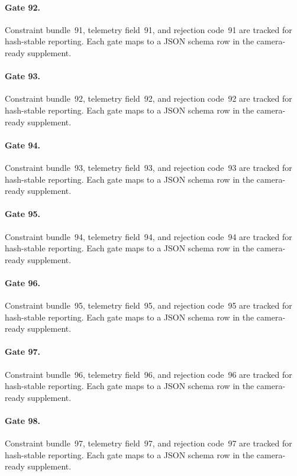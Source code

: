 \documentclass[sigconf,nonacm]{acmart}
\begin{document}
\paragraph{Gate 92.}
Constraint bundle~91, telemetry field~91, and rejection code~91 are tracked for hash-stable reporting. Each gate maps to a JSON schema row in the camera-ready supplement. %

\paragraph{Gate 93.}
Constraint bundle~92, telemetry field~92, and rejection code~92 are tracked for hash-stable reporting. Each gate maps to a JSON schema row in the camera-ready supplement. %

\paragraph{Gate 94.}
Constraint bundle~93, telemetry field~93, and rejection code~93 are tracked for hash-stable reporting. Each gate maps to a JSON schema row in the camera-ready supplement. %

\paragraph{Gate 95.}
Constraint bundle~94, telemetry field~94, and rejection code~94 are tracked for hash-stable reporting. Each gate maps to a JSON schema row in the camera-ready supplement. %

\paragraph{Gate 96.}
Constraint bundle~95, telemetry field~95, and rejection code~95 are tracked for hash-stable reporting. Each gate maps to a JSON schema row in the camera-ready supplement. %

\paragraph{Gate 97.}
Constraint bundle~96, telemetry field~96, and rejection code~96 are tracked for hash-stable reporting. Each gate maps to a JSON schema row in the camera-ready supplement. %

\paragraph{Gate 98.}
Constraint bundle~97, telemetry field~97, and rejection code~97 are tracked for hash-stable reporting. Each gate maps to a JSON schema row in the camera-ready supplement. %
\end{document}
